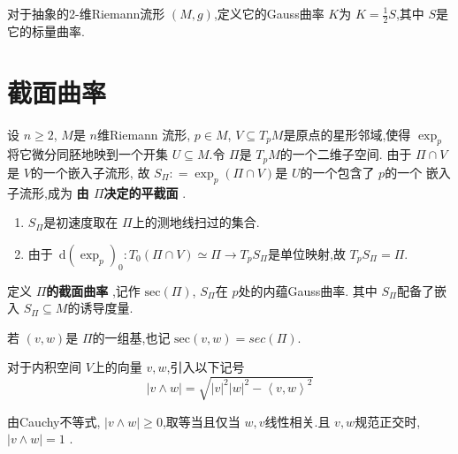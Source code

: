 \documentclass[../../几何与拓扑.tex]{subfiles}
\begin{document}
\begin{definition}
    对于抽象的2-维Riemann流形 \(  \left( M,g \right)   \),定义它的Gauss曲率 \(  K  \)为  \(  K= \frac{1}{2}S  \),其中 \(  S  \)是它的标量曲率.    
\end{definition}

\section{截面曲率}

\begin{definition}
    设  \(  n\ge 2  \), \(  M  \)是 \(  n  \)维Riemann  流形, \(  p \in M  \), \(  V\subseteq T_{p}M  \)是原点的星形邻域,使得 \(  \exp _{p}  \)将它微分同胚地映到一个开集 \(  U\subseteq M  \).令 \(  \Pi   \)是 \(  T_{p}M  \)的一个二维子空间.   由于 \(  \Pi \cap V  \)是 \(  V  \)的一个嵌入子流形, 故 \( S_{\Pi }: =   \exp _{p}\left( \Pi \cap V \right)   \)是 \(  U  \)的一个包含了 \(  p  \)的一个 嵌入子流形,成为 \textbf{由 \(  \Pi   \)决定的平截面 }.  
\end{definition}

\begin{remark}
    \begin{enumerate}
        \item \(  S_{\Pi }  \)是初速度取在 \(  \Pi   \)上的测地线扫过的集合.
        \item 由于 \(  \,\mathrm{d} \left( \exp _{p} \right)_{0} : T_{0}\left( \Pi \cap V \right)\simeq \Pi \to T_{p} S_{\Pi }   \)是单位映射,故 \(  T_{p}S_{\Pi }= \Pi   \).  
    \end{enumerate}
    
\end{remark}


\begin{definition}
    定义\textbf{ \(  \Pi   \)的截面曲率 },记作 \(  \mathrm{sec}\left( \Pi  \right)   \), \(  S_{\Pi }  \)在 \(  p  \)处的内蕴Gauss曲率. 其中 \(  S_{\Pi }  \)配备了嵌入 \(  S_{\Pi }\subseteq M  \)的诱导度量.
    
    若 \(  \left( v,w \right)   \)是 \(  \Pi   \)的一组基,也记 \(  \mathrm{sec}\left( v,w \right)=  sec\left( \Pi  \right)    \).   
\end{definition}

\begin{definition}
    对于内积空间 \(  V  \)上的向量 \(  v,w  \),引入以下记号 \[
    \left| v\wedge w \right|= \sqrt{\left| v \right|^{2}\left| w \right|^{2}-\left<v,w \right>^{2}  } 
    \]  
\end{definition}
\begin{remark}
    由Cauchy不等式, \(  \left| v\wedge w \right|\ge 0   \),取等当且仅当 \(  w,v  \)线性相关.且 \(  v,w  \)规范正交时, \(  \left| v\wedge w \right|= 1   \)    .
\end{remark}
\end{document}
